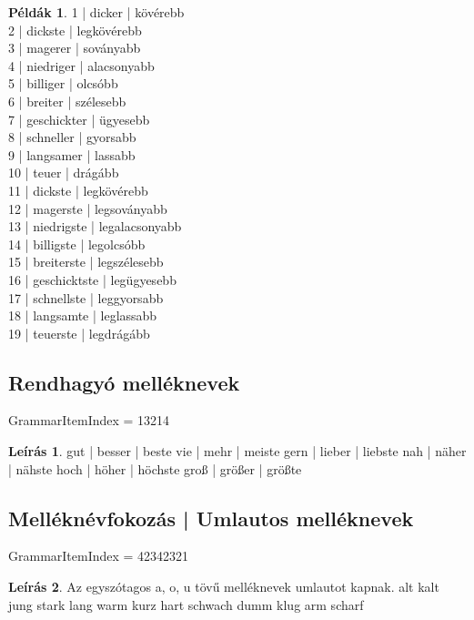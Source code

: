 \documentclass{article}
\theoremstyle{definition}
\newtheorem*{exmp}{Példák}
\newtheorem*{desc}{Leírás}
\begin{document}
\begin{exmp}
1 | dicker | kövérebb\\
2 | dickste | legkövérebb\\
3 | magerer | soványabb\\
4 | niedriger | alacsonyabb\\
5 | billiger | olcsóbb\\
6 | breiter | szélesebb\\
7 | geschickter | ügyesebb\\
8 | schneller | gyorsabb\\
9 | langsamer | lassabb\\
10 | teuer | drágább\\
11 | dickste | legkövérebb\\
12 | magerste | legsoványabb\\
13 | niedrigste | legalacsonyabb\\
14 | billigste | legolcsóbb\\
15 | breiterste | legszélesebb\\
16 | geschicktste | legügyesebb\\
17 | schnellste | leggyorsabb\\
18 | langsamte | leglassabb\\
19 | teuerste | legdrágább\\
\end{exmp}

\subsection{Rendhagyó melléknevek}

GrammarItemIndex = 13214

\begin{desc}
gut | besser | beste
vie | mehr | meiste
gern | lieber | liebste
nah | näher | nähste
hoch | höher | höchste
groß | größer | größte
\end{desc}

\subsection{Melléknévfokozás | Umlautos melléknevek}

GrammarItemIndex = 42342321

\begin{desc}
Az egyszótagos a, o, u tövű melléknevek umlautot kapnak.
alt
kalt
jung
stark
lang
warm
kurz
hart
schwach
dumm
klug
arm
scharf
\end{desc}
\end{document}
